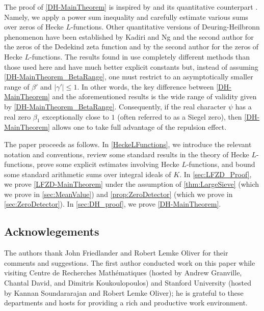 \documentclass[12pt,psamsfonts]{amsart}
\theoremstyle{definition}
\theoremstyle{remark}
\numberwithin{equation}{section}
\newcounter{notation}
\theoremstyle{plain}
\theoremstyle{remark}
\renewcommand{\1}{ {\bf 1}}
\begin{document}
The proof of \cref{DH-MainTheorem} is inspired by \cite[Theorem 5.1]{LMO} and its quantitative counterpart \cite[Theorem 1.2]{Zaman_2015c}. Namely, we apply a power sum inequality and carefully estimate various sums over zeros of Hecke $L$-functions. Other quantitative versions of Deuring-Heilbronn phenomenon have been established by Kadiri and Ng \cite{KadiriNg} and the second author \cite{Zaman_2015c} for the zeros of the Dedekind zeta function and by the second author \cite{Zaman_2015a}  for the zeros of Hecke $L$-functions. The results found in \cite{KadiriNg,Zaman_2015a} use completely different methods than those used here and have much better explicit constants but, instead of assuming \eqref{DH-MainTheorem_BetaRange}, one must restrict to an asymptotically smaller range of $\beta'$ and $|\gamma'| \leq 1$. In other words, the key difference between \cref{DH-MainTheorem} and the aforementioned results is the wide range of validity given by \eqref{DH-MainTheorem_BetaRange}. Consequently, if the real character $\psi$ has a real zero $\beta_1$ exceptionally close to $1$ (often referred to as a Siegel zero), then \cref{DH-MainTheorem} allows one to take full advantage of the repulsion effect. 

 
The paper proceeds as follows.  In \cref{HeckeLFunctions}, we introduce the relevant notation and  conventions, review some standard results in the theory of Hecke $L$-functions, prove some explicit estimates involving Hecke $L$-functions, and bound some standard arithmetic sums over integral ideals of $K$.  In \cref{sec:LFZD_Proof}, we prove \cref{LFZD-MainTheorem} under the assumption of \cref{thm:LargeSieve} (which we prove in \cref{sec:MeanValue}) and \cref{prop:ZeroDetector} (which we prove in \cref{sec:ZeroDetector}).  In \cref{sec:DH_proof}, we prove \cref{DH-MainTheorem}.

\subsection*{Acknowlegements}
The authors thank John Friedlander and Robert Lemke Oliver for their comments and suggestions.  The first author conducted work on this paper while visiting Centre de Recherches Math\'ematiques (hosted by Andrew Granville, Chantal David, and Dimitris Koukoulopoulos) and Stanford University (hosted by Kannan Soundararajan and Robert Lemke Oliver); he is grateful to these departments and hosts for providing a rich and productive work environment.

\end{document}
